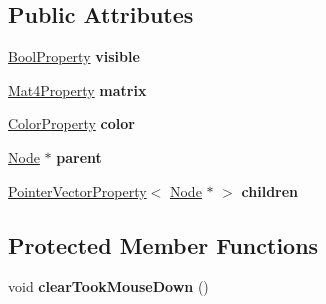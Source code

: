 \subsection*{Public Attributes}
\begin{DoxyCompactItemize}
\item 
\hypertarget{classg2c_1_1_node_a013a11565ef6a10a0a3063a3303bd6b0}{
\hyperlink{classg2c_1_1_bool_property}{BoolProperty} {\bfseries visible}}
\label{classg2c_1_1_node_a013a11565ef6a10a0a3063a3303bd6b0}

\item 
\hypertarget{classg2c_1_1_node_a84c49e3f59428ce2078280b248a4b4e3}{
\hyperlink{classg2c_1_1_mat4_property}{Mat4Property} {\bfseries matrix}}
\label{classg2c_1_1_node_a84c49e3f59428ce2078280b248a4b4e3}

\item 
\hypertarget{classg2c_1_1_node_abff34b730d28a6152ae8894f310d6a61}{
\hyperlink{classg2c_1_1_color_property}{ColorProperty} {\bfseries color}}
\label{classg2c_1_1_node_abff34b730d28a6152ae8894f310d6a61}

\item 
\hypertarget{classg2c_1_1_node_ad1f3950a5a9df84ed9f2c6d0bc817447}{
\hyperlink{classg2c_1_1_node}{Node} $\ast$ {\bfseries parent}}
\label{classg2c_1_1_node_ad1f3950a5a9df84ed9f2c6d0bc817447}

\item 
\hypertarget{classg2c_1_1_node_ab205e2bfa5563dad139689ad9c46cd47}{
\hyperlink{classg2c_1_1_pointer_vector_property}{PointerVectorProperty}$<$ \hyperlink{classg2c_1_1_node}{Node} $\ast$ $>$ {\bfseries children}}
\label{classg2c_1_1_node_ab205e2bfa5563dad139689ad9c46cd47}

\end{DoxyCompactItemize}
\subsection*{Protected Member Functions}
\begin{DoxyCompactItemize}
\item 
\hypertarget{classg2c_1_1_node_a22049c7eabbe302ec8da13309e350b41}{
void {\bfseries clearTookMouseDown} ()}
\label{classg2c_1_1_node_a22049c7eabbe302ec8da13309e350b41}

\end{DoxyCompactItemize}
